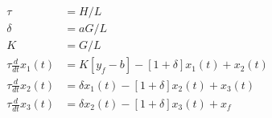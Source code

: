 \begin{equation}
  \begin{aligned}
    \tau                    & = H / L
    \\
    \delta                  & = a G / L
    \\
    K                       & = G / L
    \\
    \tau \frac{d}{dt}x_1(t) & = K[y_f - b] - [1 + \delta] x_1(t) + x_2(t)
    \\
    \tau \frac{d}{dt}x_2(t) & = \delta x_1(t) - [1 + \delta] x_2(t) + x_3(t)
    \\
    \tau \frac{d}{dt}x_3(t) & = \delta x_2(t) - [1 + \delta] x_3(t) + x_f
  \end{aligned}
  \label{eq:three_absorber01_1}
\end{equation}